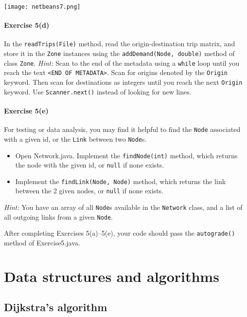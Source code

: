 \documentclass[11pt]{article}
\begin{document}
\begin{center}
	\texttt{[image: netbeans7.png]}
\end{center}

\paragraph*{Exercise 5(d)} In the \texttt{readTrips(File)} method, read the origin-destination trip matrix, and store it in the \texttt{Zone} instances using the \texttt{addDemand(Node, double)} method of class \texttt{Zone}. \textit{Hint:} Scan to the end of the metadata using a \texttt{while} loop until you reach the text \texttt{<END OF METADATA>}. Scan for origins denoted by the \texttt{Origin} keyword. Then scan for destinations as integers until you reach the next \texttt{Origin} keyword. Use \texttt{Scanner.next()} instead of looking for new lines. 


\paragraph*{Exercise 5(e)} For testing or data analysis, you may find it helpful to find the \texttt{Node} associated with a given id, or the \texttt{Link} between two \texttt{Node}s. 
\begin{itemize}
	\item Open Network.java. Implement the \texttt{findNode(int)} method, which returns the node with the given id, or \texttt{null} if none exists.
	
	\item Implement the \texttt{findLink(Node, Node)} method, which returns the link between the 2 given nodes, or \texttt{null} if none exists.
\end{itemize}
\textit{Hint:} You have an array of all \texttt{Node}s available in the \texttt{Network} class, and a list of all outgoing links from a given \texttt{Node}. 


 \vspace{\baselineskip}


\noindent
After completing Exercises 5(a)--5(e), your code should pass the \texttt{autograde()} method of Exercise5.java. 




\section{Data structures and algorithms}


\subsection{Dijkstra's algorithm}
\end{document}
